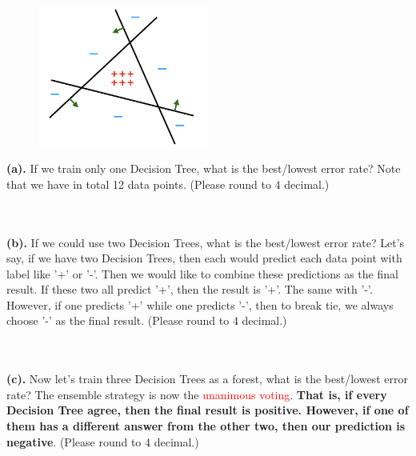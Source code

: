 \documentclass[12pt]{article}
\begin{document}
\begin{enumerate}
    \begin{figure}[H]
        \centering
        \includegraphics[width = 0.5\textwidth]{ensemble_dt.png}
        \label{Q_ensemble_DT}
    \end{figure}
    
    \textbf{(a).} If we train only one Decision Tree, what is the best/lowest error rate? Note that we have in total 12 data points. (Please round to 4 decimal.) \\ \\
    \begin{tcolorbox}[fit,height=1cm, width=15cm, blank, borderline={1pt}{-2pt}, nobeforeafter]
    \end{tcolorbox} \\
    
    

    \textbf{(b).} If we could use two Decision Trees, what is the best/lowest error rate? Let's say, if we have two Decision Trees, then each would predict each data point with label like '+' or '-'. Then we would like to combine these predictions as the final result. If these two all predict '+', then the result is '+'. The same with '-'. However, if one predicts '+' while one predicts '-', then to break tie, we always choose '-' as the final result. (Please round to 4 decimal.) \\ \\
    \begin{tcolorbox}[fit,height=1cm, width=15cm, blank, borderline={1pt}{-2pt}, nobeforeafter]
    \end{tcolorbox} \\
    

    \textbf{(c).} Now let's train three Decision Trees as a forest, what is the best/lowest error rate? The ensemble strategy is now the \textcolor{red}{unanimous voting}. \textbf{That is, if every Decision Tree agree, then the final result is positive. However, if one of them has a different answer from the other two, then our prediction is negative}. (Please round to 4 decimal.) \\ \\
    \begin{tcolorbox}[fit,height=1cm, width=15cm, blank, borderline={1pt}{-2pt}, nobeforeafter]
    \end{tcolorbox} \\
    

\end{enumerate}
\end{document}
